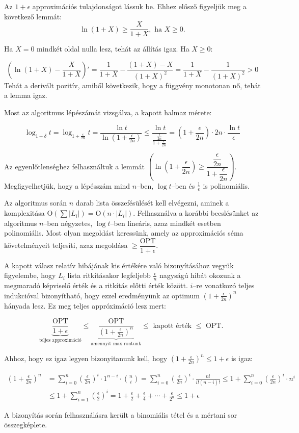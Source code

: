 Az $1+\epsilon$ approximációs tulajdonságot lássuk be. Ehhez elősző figyeljük
meg a következő lemmát:
\[ \ln{(1+X)} \geq \frac{X}{1+X}, \mbox{ ha } X \geq 0.\]

Ha $X=0$ mindkét oldal nulla lesz, tehát az állítás igaz. Ha $X \geq 0$:

\[ \left( \ln{(1+X)} - \frac{X}{1+X}\right)' = \frac{1}{1+X} - \frac{(1+X)-X}{(1+X)^2} =
	\frac{1}{1+X} - \frac{1}{(1+X)^2} > 0
\]
Tehát a derivált pozitív, amiből következik, hogy a függvény monotonan nő, tehát
a lemma igaz.

Most az algoritmus lépészámát vizsgálva, a kapott halmaz mérete:

\[ \log_{1+\delta}{t}=\log_{1+\frac{\epsilon}{2n} }{t} = \frac{\ln{t}}{\ln(1+\frac{\epsilon}{2n})}
	\leq \frac{\ln{t}}{\frac{\frac{\epsilon}{2n}}{1+\frac{\epsilon}{2n}}}
	= \left(1 + \frac{\epsilon}{2n} \right) \cdot 2n \cdot \frac{\ln{t}}{\epsilon} \]

Az egyenlőtlenséghez felhasználtuk a lemmát $\left(\ln(1+\dfrac{\epsilon}{2n})
	\geq \dfrac{\dfrac{\epsilon}{2n}}{1+\dfrac{\epsilon}{2n}}\right)$.
Megfigyelhetjük, hogy a lépésszám mind $n$--ben, $\log t$--ben és
$\frac{1}{\epsilon}$ is polinomiális.

Az algoritmus során $n$ darab lista összefésülését kell elvégezni, aminek a
komplexitása O$(\sum |L_i|)=$O$(n \cdot |L_i|)$. Felhasználva a korábbi
becslésünket az algoritmus $n$--ben négyzetes, $\log{t}$--ben lineáris, azaz
mindkét esetben polinomiális. Most olyan megoldást keressünk, amely az
approximációs séma követelményeit teljesíti, azaz megoldása $\geq
	\dfrac{\mbox{OPT}}{1+\epsilon}$.

A kapott válasz relatív hibájának kis értékére való bizonyításához vegyük
figyelembe, hogy $L_i$ lista ritkításakor legfeljebb $\frac{\epsilon}{n}$
nagyságú hibát okozunk a megmaradó képviselő érték és a ritkítás előtti érték
között. $i$--re vonatkozó teljes indukcióval bizonyítható, hogy ezzel
eredményünk az optimum $(1+ \frac{\epsilon}{2n})^n$ hányada lesz. Ez meg teljes
appróximáció lesz mert:

\[ \underbrace{\frac{\mbox{OPT}}{1+\epsilon}}_{\mbox{teljes approximáció}} \leq
	\underbrace{\frac{\mbox{OPT}}{(1+ \frac{\epsilon}{2n})^n}}_{\mbox{amennyit max
			rontunk}} \leq \mbox{ kapott érték } \leq \mbox{ OPT. }\]

Ahhoz, hogy ez igaz legyen bizonyitanunk kell, hogy $(1+\frac{\epsilon}{2n})^n
	\leq 1 + \epsilon$ is igaz:

\begin{align*}
	\left(1+\frac{\epsilon}{2n}\right)^n & =
	\sum_{i=0}^{n}\left(\frac{\epsilon}{2n}\right)^i \cdot 1^{n-i} \cdot \binom{n}{i} =
	\sum_{i=0}^{n}\left(\frac{\epsilon}{2n}\right)^i \cdot \frac{n!}{i!(n-i)!}
	\leq 1 + \sum_{i=0}^{n}\left(\frac{\epsilon}{2n}\right)^i \cdot n^i                                                      \\
	                                     & \leq 1 + \sum_{i=1}^{n}\left(\frac{\epsilon}{2}\right)^i = 1 + \frac{\epsilon}{2}
	+ \frac{\epsilon}{4} + \cdots + \frac{\epsilon}{2^n} \leq 1 + \epsilon
\end{align*}

A bizonyítás során felhasználásra került a binomiális tétel és a mértani sor
összegképlete.
